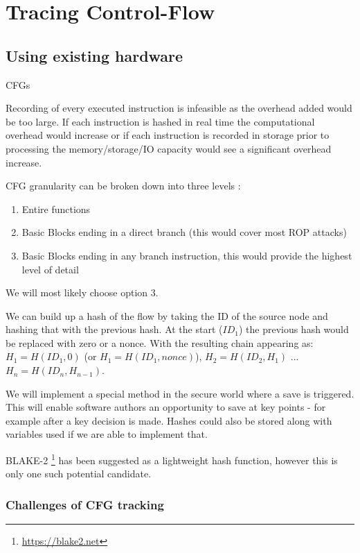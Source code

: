 \section{Tracing Control-Flow}

\subsection{Using existing hardware}

CFGs 

Recording of every executed instruction is infeasible as the overhead added would be too large. If each instruction is hashed in real time the computational overhead would increase or if each instruction is recorded in storage prior to processing the memory\slash storage\slash IO capacity would see a significant overhead increase.

CFG granularity can be broken down into three levels \cite{Abera2016}:
\begin{enumerate}
	\item{Entire functions}
	\item{Basic Blocks ending in a direct branch (this would cover most ROP attacks)}
	\item{Basic Blocks ending in any branch instruction, this would provide the highest level of detail}
\end{enumerate}

We will most likely choose option 3.

We can build up a hash of the flow by taking the ID of the source node and hashing that with the previous hash. At the start ($ID_1$) the previous hash would be replaced with zero or a nonce. With the resulting chain appearing as: 
$H_1 = H(ID_1,0)$ (or $H_1 = H(ID_1,nonce)$), $H_2 = H(ID_2,H_1)$ ... $H_n = H(ID_n,H_{n-1})$.

We will implement a special method in the secure world where a save is triggered. This will enable software authors an opportunity to save at key points - for example after a key decision is made. Hashes could also be stored along with variables used if we are able to implement that.

BLAKE-2 \footnote{\url{https://blake2.net}} has been suggested as a lightweight hash function, however this is only one such potential candidate.

\subsubsection{Challenges of CFG tracking}

